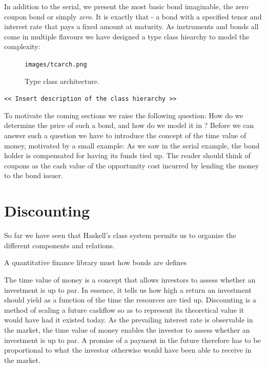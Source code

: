 In addition to the serial, we present the most basic bond imaginable, the zero 
coupon bond or simply \emph{zero}. It is exactly that - a bond with a specified 
tenor and interest rate that pays a fixed amount at maturity. As instruments and
bonds all come in multiple flavours we have designed a type class hiearchy to
model the complexity:

\begin{figure}[!htb]
\centering
\texttt{images/tcarch.png}
\caption{Type class architecture.}
\label{fig:comp02}
\end{figure}


\begin{center}
\texttt{<< Insert description of the class hierarchy >>}\\
\end{center}

To motivate the coming sections we raise the following question: How do we
determine the price of such a bond, 
and how do we model it in \hql? Before we can answer such a question we have to 
introduce the concept of the time value of money, motivated by a small example: 
As we saw in the serial example, the bond holder is compensated for having its 
funds tied up. The reader should think of coupons as the cash value of the 
opportunity cost incurred by lending the money to the bond issuer.

\section{Discounting}\label{sec:discounting}

So far we have seen that Haskell's class system permits us to organize the 
different components and relations.

A quantitative finance library must how bonds are \hql defines

The time value of money is a concept that allows investors to assess whether an 
investment is up to par. In essence, it tells us how high a return an 
investment should yield as a function of the time the resources are tied up. 
Discounting is a method of scaling a future cashflow so as to represent its 
theoretical value it would have had it existed today. As the prevailing 
interest rate is observable in the market, the time value of money enables the 
investor to assess whether an investment is up to par. A promise of a payment 
in the future therefore has to be proportional to what the investor otherwise 
would have been able to receive in the market.\\

